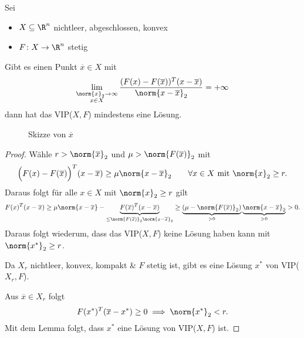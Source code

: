 \begin{satz}
	Sei
	\begin{itemize}
		\item $X \subseteq \R^{n}$ nichtleer, abgeschlossen, konvex
		\item $F \colon X \rightarrow \R^{n} $ stetig
	\end{itemize}
	Gibt es einen Punkt $\overline{x} \in X$ mit
	\[
		\lim_{\substack{\norm{x}_{2} \rightarrow \infty \\ x \in X}} \frac{(F(x) - F(\overline{x}))^{T}(x-\overline{x})}{\norm{x-\overline{x}}_{2} } = + \infty
	\] 
	dann hat das VIP($X,F$) mindestens eine Lösung.
\end{satz}

\begin{figure}[H]
	\begin{center}
		
	\end{center}
	\caption{Skizze von $\overline{x}$}
	\label{fig:XR3}
\end{figure}
	
\begin{proof}
	Wähle $r > \norm{\overline{x}}_{2} $ und $\mu > \norm{F(\overline{x})} _{2}$ mit
	\[
		\Big( F(x) - F(\overline{x}) \Big) ^{T}(x-\overline{x}) \geq  \mu  \norm{x -\overline{x}} _{2} \qquad \forall x \in X \text{ mit } \norm{x} _{2} \geq  r
	.\] 
	Daraus folgt für alle $x \in X$ mit $\norm{x} _{2}\geq r$ gilt
	\[
		F(x)^{T}(x-\overline{x}) \geq  \mu \norm{x-\overline{x}} - \underbrace{F(\overline{x})^{T}(x-\overline{x})}_{\leq \norm{F(\overline{x})} _{2}\norm{x-\overline{x}} _{2}} \geq \underbrace{(\mu -\norm{F(\overline{x})} _{2})}_{>0} \underbrace{\norm{x-\overline{x}} _{2}}_{>0} >0
	.\] 
	Daraus folgt wiederum, dass das VIP($X,F$) keine Lösung haben kann mit $\norm{{x}^{*}} _{2}\geq  r$.

	Da $X_{r}$ nichtleer, konvex, kompakt \& $F$ stetig ist, gibt es eine Lösung ${x}^{*}$ von VIP($X_{r},F$).

	Aus $\overline{x} \in X_{r}$ folgt
	\[
		F({x}^{*})^{T}(\overline{x}-{x}^{*})\geq 0 \implies \norm{{x}^{*}} _{2}< r
	.\] 
	Mit dem Lemma folgt, dass ${x}^{*}$ eine Lösung von VIP($X,F$) ist.
\end{proof}
